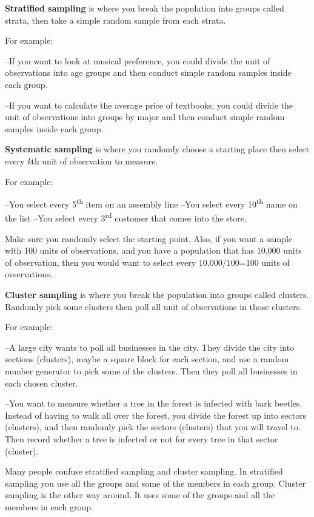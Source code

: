 \documentclass[
]{book}
\begin{document}
\textbf{Stratified sampling} is where you break the population into groups called strata, then take a simple random sample from each strata.

For example:

--If you want to look at musical preference, you could divide the unit of observations into age groups and then conduct simple random samples inside each group.

--If you want to calculate the average price of textbooks, you could divide the unit of observations into groups by major and then conduct simple random samples inside each group.

\textbf{Systematic sampling} is where you randomly choose a starting place then select every \emph{k}th unit of observation to measure.

For example:

--You select every 5\textsuperscript{th} item on an assembly line
--You select every 10\textsuperscript{th} name on the list
--You select every 3\textsuperscript{rd} customer that comes into the store.

Make sure you randomly select the starting point. Also, if you want a sample with 100 units of observations, and you have a population that has 10,000 units of observation, then you would want to select every 10,000/100=100 units of ovservations.

\textbf{Cluster sampling} is where you break the population into groups called clusters. Randomly pick some clusters then poll all unit of observations in those clusters.

For example:

--A large city wants to poll all businesses in the city. They divide the city into sections (clusters), maybe a square block for each section, and use a random number generator to pick some of the clusters. Then they poll all businesses in each chosen cluster.

--You want to measure whether a tree in the forest is infected with bark beetles. Instead of having to walk all over the forest, you divide the forest up into sectors (clusters), and then randomly pick the sectors (clusters) that you will travel to. Then record whether a tree is infected or not for every tree in that sector (cluster).

Many people confuse stratified sampling and cluster sampling. In stratified sampling you use {all} the groups and {some} of the members in each group. Cluster sampling is the other way around. It uses {some} of the groups and {all} the members in each group.
\end{document}
